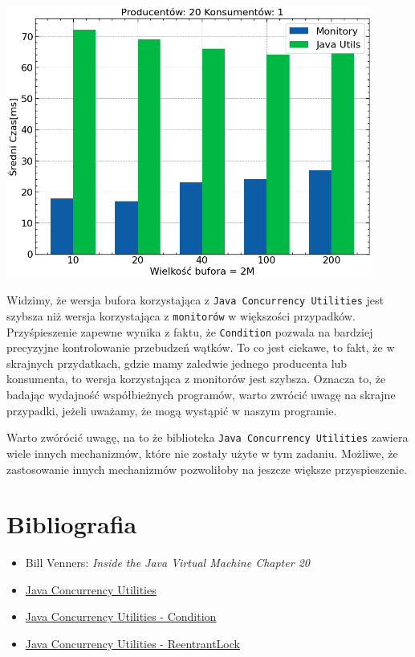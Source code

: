 \documentclass[11pt]{article}
\begin{document}
\begin{center}
\includegraphics[width=12cm]{./m20_n1.png}
\end{center}

Widzimy, że wersja bufora korzystająca z \texttt{Java Concurrency Utilities} jest szybsza
niż wersja korzystająca z \texttt{monitorów} w większości przypadków.
Przyśpieszenie zapewne wynika z faktu, że \texttt{Condition} pozwala na bardziej precyzyjne
kontrolowanie przebudzeń wątków.
To co jest ciekawe, to fakt, że w skrajnych przydatkach, gdzie mamy zaledwie
jednego producenta lub konsumenta, to wersja korzystająca z monitorów jest szybsza.
Oznacza to, że badając wydajność współbieżnych programów, warto zwrócić uwagę na
skrajne przypadki, jeżeli uważamy, że mogą wystąpić w naszym programie.

Warto zwórócić uwagę, na to że biblioteka \texttt{Java Concurrency Utilities}
zawiera wiele innych mechanizmów, które nie zostały użyte w tym zadaniu.
Możliwe, że zastosowanie innych mechanizmów pozwoliłoby na jeszcze większe przyspieszenie.
\section*{Bibliografia}
\label{sec:orgfc66afa}
\begin{itemize}
\item Bill Venners: \emph{Inside the Java Virtual Machine Chapter 20}
\item \href{https://docs.oracle.com/javase/1.5.0/docs/guide/concurrency/overview.html}{Java Concurrency Utilities}
\item \href{https://docs.oracle.com/javase/1.5.0/docs/api/java/util/concurrent/locks/Condition.html}{Java Concurrency Utilities - Condition}
\item \href{https://docs.oracle.com/javase/1.5.0/docs/api/java/util/concurrent/locks/ReentrantLock.html}{Java Concurrency Utilities - ReentrantLock}
\end{itemize}
\end{document}
